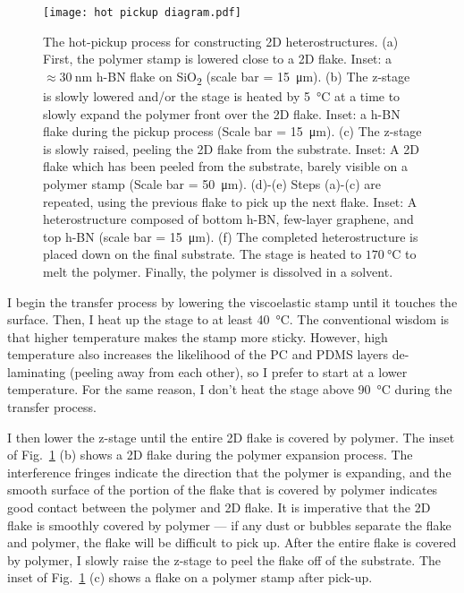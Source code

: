 \documentclass[double,12pt,1in,seploa]{beavtex}
\begin{document}
\begin{figure}
    \texttt{[image: hot pickup diagram.pdf]}
    \caption{The hot-pickup process for constructing 2D heterostructures. (a) First, the polymer stamp is lowered close to a 2D flake. Inset: a $\approx \SI{30}{\nano\meter}$ h-BN flake on SiO\textsubscript{2} (scale bar = \SI{15}{\micro\meter}). (b) The z-stage is slowly lowered and/or the stage is heated by \SI{5}{\celsius} at a time to slowly expand the polymer front over the 2D flake. Inset: a h-BN flake during the pickup process (Scale bar = \SI{15}{\micro\meter}). (c) The z-stage is slowly raised, peeling the 2D flake from the substrate. Inset: A 2D flake which has been peeled from the substrate, barely visible on a polymer stamp (Scale bar = \SI{50}{\micro\meter}). (d)-(e) Steps (a)-(c) are repeated, using the previous flake to pick up the next flake. Inset: A heterostructure composed of bottom h-BN, few-layer graphene, and top h-BN (scale bar = \SI{15}{\micro\meter}). (f) The completed heterostructure is placed down on the final substrate. The stage is heated to $\SI{170}{\celsius}$ to melt the polymer. Finally, the polymer is dissolved in a solvent.}
    \label{hot pickup diagram}
\end{figure}

I begin the transfer process by lowering the viscoelastic stamp until it touches the surface. Then, I heat up the stage to at least \SI{40}{\celsius}. The conventional wisdom is that higher temperature makes the stamp more sticky. However, high temperature also increases the likelihood of the PC and PDMS layers de-laminating (peeling away from each other), so I prefer to start at a lower temperature. For the same reason, I don't heat the stage above \SI{90}{\celsius} during the transfer process. 

I then lower the z-stage until the entire 2D flake is covered by polymer. The inset of Fig.\ \ref{hot pickup diagram} (b) shows a 2D flake during the polymer expansion process. The interference fringes indicate the direction that the polymer is expanding, and the smooth surface of the portion of the flake that is covered by polymer indicates good contact between the polymer and 2D flake. It is imperative that the 2D flake is smoothly covered by polymer — if any dust or bubbles separate the flake and polymer, the flake will be difficult to pick up. After the entire flake is covered by polymer, I slowly raise the z-stage to peel the flake off of the substrate. The inset of Fig.\ \ref{hot pickup diagram} (c) shows a flake on a polymer stamp after pick-up.
\end{document}
